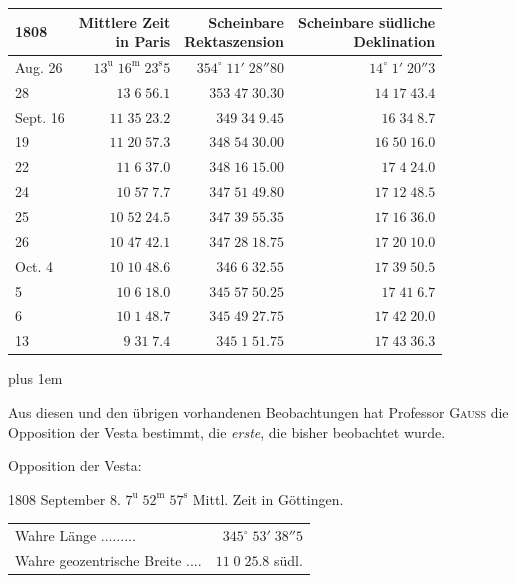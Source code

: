 \begin{center}\fontsize{10}{12}\selectfont\setlength{\tabcolsep}{5pt}\renewcommand{\arraystretch}{1.15}\begin{tabular}{lrrr}
1808 & \shortstack{Mittlere Zeit\\in Paris} & \shortstack{Scheinbare\\Rektaszension} & \shortstack{Scheinbare südliche\\Deklination}\\
\hline
Aug. 26 & $13^{\text{u}}\;16^{\text{m}}\;23^{\text{s}}5$ & $354^\circ\;11'\;28''80$ & $14^\circ\;1'\;20''3$\\
28 & $13\;6\;56.1$ & $353\;47\;30.30$ & $14\;17\;43.4$\\
Sept. 16 & $11\;35\;23.2$ & $349\;34\;9.45$ & $16\;34\;8.7$\\
19 & $11\;20\;57.3$ & $348\;54\;30.00$ & $16\;50\;16.0$\\
22 & $11\;6\;37.0$ & $348\;16\;15.00$ & $17\;4\;24.0$\\
24 & $10\;57\;7.7$ & $347\;51\;49.80$ & $17\;12\;48.5$\\
25 & $10\;52\;24.5$ & $347\;39\;55.35$ & $17\;16\;36.0$\\
26 & $10\;47\;42.1$ & $347\;28\;18.75$ & $17\;20\;10.0$\\
Oct.  4 & $10\;10\;48.6$ & $346\;6\;32.55$ & $17\;39\;50.5$\\
5 & $10\;6\;18.0$ & $345\;57\;50.25$ & $17\;41\;6.7$\\
6 & $10\;1\;48.7$ & $345\;49\;27.75$ & $17\;42\;20.0$\\
13 & $9\;31\;7.4$ & $345\;1\;51.75$ & $17\;43\;36.3$\\
\end{tabular}\end{center}


{\rightskip=0pt plus 1em \par\indent Aus diesen und den übrigen vorhandenen Beobachtungen hat Professor \textsc{Gauss} die Opposition der Vesta bestimmt, die \emph{erste}, die bisher beobachtet wurde.\par}

\begin{center}Opposition der Vesta:

1808 September 8. $7^{\text{u}}\;52^{\text{m}}\;57^{\text{s}}$ Mittl. Zeit in Göttingen.
\end{center}
\begin{center}\fontsize{10}{12}\selectfont\setlength{\tabcolsep}{5pt}\renewcommand{\arraystretch}{1.15}\begin{tabular}{lr}

Wahre Länge .\;.\;.\;.\;.\;.\;.\;.\;.\; & $345^\circ\;53'\;38''5$\\
Wahre geozentrische Breite .\;.\;.\;.\; & $11\;0\;25.8$ südl.\\
\end{tabular}\end{center}


